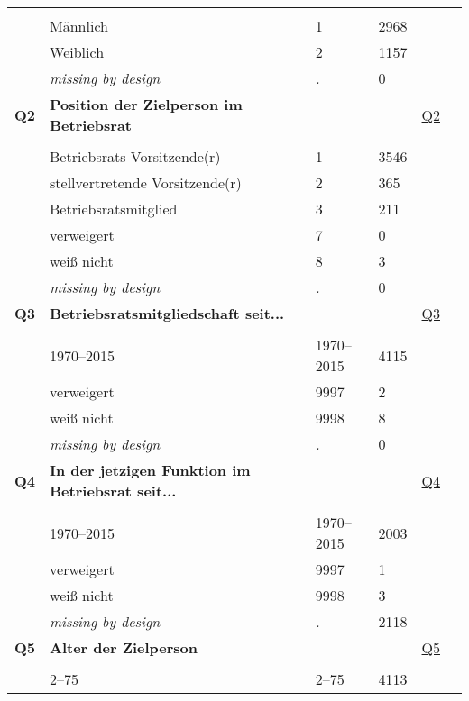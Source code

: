 \begin{longtable}{| L{2.45cm} | L{6cm} | C{1.5cm} | R{1cm} | C{2.25cm} | C{2.25cm} |}
   &  &  &  &  &  \\ 
   & Männlich & 1 & 2968 &  &  \\ 
   & Weiblich & 2 & 1157 &  &  \\ 
   & \textit{missing by design} & \textit{.} & 0 &  &  \\ 
   \midrule
\textbf{Q2}\label{var:Q2} & \textbf{Position der Zielperson im Betriebsrat} &  &  & \hyperref[Q2]{Q2} & \hyperref[var:suf:]{} \\ 
   &  &  &  &  &  \\ 
   & Betriebsrats-Vorsitzende(r) & 1 & 3546 &  &  \\ 
   & stellvertretende Vorsitzende(r) & 2 & 365 &  &  \\ 
   & Betriebsratsmitglied & 3 & 211 &  &  \\ 
   & verweigert & 7 & 0 &  &  \\ 
   & weiß nicht & 8 & 3 &  &  \\ 
   & \textit{missing by design} & \textit{.} & 0 &  &  \\ 
   \midrule
\textbf{Q3}\label{var:Q3} & \textbf{Betriebsratsmitgliedschaft seit...} &  &  & \hyperref[Q3]{Q3} & \hyperref[var:suf:]{} \\ 
   &  &  &  &  &  \\ 
   & 1970--2015 & 1970--2015 & 4115 &  &  \\ 
   & verweigert & 9997 & 2 &  &  \\ 
   & weiß nicht & 9998 & 8 &  &  \\ 
   & \textit{missing by design} & \textit{.} & 0 &  &  \\ 
   \midrule
\textbf{Q4}\label{var:Q4} & \textbf{In der jetzigen Funktion im Betriebsrat seit...} &  &  & \hyperref[Q4]{Q4} & \hyperref[var:suf:]{} \\ 
   &  &  &  &  &  \\ 
   & 1970--2015 & 1970--2015 & 2003 &  &  \\ 
   & verweigert & 9997 & 1 &  &  \\ 
   & weiß nicht & 9998 & 3 &  &  \\ 
   & \textit{missing by design} & \textit{.} & 2118 &  &  \\ 
   \midrule
\textbf{Q5}\label{var:Q5} & \textbf{Alter der Zielperson} &  &  & \hyperref[Q5]{Q5} & \hyperref[var:suf:]{} \\ 
   &  &  &  &  &  \\ 
   & 2--75 & 2--75 & 4113 &  &  \\ 

\end{longtable}
